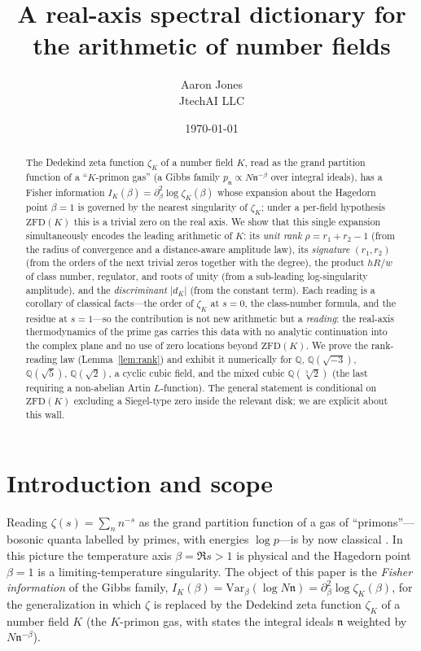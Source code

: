 \documentclass[a4paper,11pt]{article}
\title{A real-axis spectral dictionary for the arithmetic of number fields}
\author{Aaron Jones\\ \small JtechAI LLC}
\date{\today}
\theoremstyle{plain}
\theoremstyle{definition}
\theoremstyle{remark}
\newcommand{\Q}{\mathbb{Q}}
\begin{document}
\maketitle

\begin{abstract}
The Dedekind zeta function $\zeta_K$ of a number field $K$, read as the grand partition function of a
``$K$-primon gas'' (a Gibbs family $p_\mathfrak{n}\propto N\mathfrak{n}^{-\beta}$ over integral ideals), has
a Fisher information $I_K(\beta)=\partial_\beta^2\log\zeta_K(\beta)$ whose expansion about the Hagedorn point
$\beta=1$ is governed by the nearest singularity of $\zeta_K$; under a per-field hypothesis $\mathrm{ZFD}(K)$
this is a trivial zero on the real axis. We show that this single expansion simultaneously encodes the
leading arithmetic of $K$: its \emph{unit rank} $\rho=r_1+r_2-1$ (from the radius of convergence and a
distance-aware amplitude law), its \emph{signature} $(r_1,r_2)$ (from the orders of the next trivial zeros
together with the degree), the product $hR/w$ of class number, regulator, and roots of unity (from a
sub-leading log-singularity amplitude), and the \emph{discriminant} $|d_K|$ (from the constant term). Each
reading is a corollary of classical facts---the order of $\zeta_K$ at $s=0$, the class-number formula, and
the residue at $s=1$---so the contribution is not new arithmetic but a \emph{reading}: the real-axis
thermodynamics of the prime gas carries this data with no analytic continuation into the complex plane and
no use of zero locations beyond $\mathrm{ZFD}(K)$. We prove the rank-reading law (Lemma~\ref{lem:rank}) and
exhibit it numerically for $\Q$, $\Q(\sqrt{-3})$, $\Q(\sqrt5)$, $\Q(\sqrt2)$, a cyclic cubic field, and the
mixed cubic $\Q(\sqrt[3]2)$ (the last requiring a non-abelian Artin $L$-function). The general statement is
conditional on $\mathrm{ZFD}(K)$ excluding a Siegel-type zero inside the relevant disk; we are explicit
about this wall.
\end{abstract}

\section{Introduction and scope}\label{sec:intro}
Reading $\zeta(s)=\sum_n n^{-s}$ as the grand partition function of a gas of ``primons''---bosonic quanta
labelled by primes, with energies $\log p$---is by now classical \cite{julia1994,spector1990,bost1995}. In
this picture the temperature axis $\beta=\Re s>1$ is physical and the Hagedorn point $\beta=1$ is a
limiting-temperature singularity. The object of this paper is the \emph{Fisher information} of the Gibbs
family, $I_K(\beta)=\mathrm{Var}_\beta(\log N\mathfrak n)=\partial_\beta^2\log\zeta_K(\beta)$, for the
generalization in which $\zeta$ is replaced by the Dedekind zeta function $\zeta_K$ of a number field $K$
(the $K$-primon gas, with states the integral ideals $\mathfrak n$ weighted by $N\mathfrak n^{-\beta}$).
\end{document}

